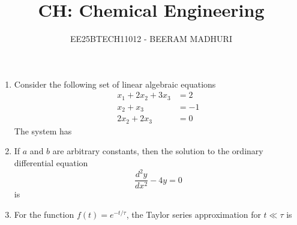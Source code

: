 \documentclass[journal,12pt,onecolumn]{IEEEtran}
\theoremstyle{remark}
\begin{document}
\title{CH: Chemical Engineering}
\author{EE25BTECH11012 - BEERAM MADHURI}
\maketitle
\renewcommand{\thefigure}{\theenumi}
\renewcommand{\thetable}{\theenumi}

\begin{enumerate}

\item Consider the following set of linear algebraic equations
\begin{align*}x_1 + 2x_2 + 3x_3 &= 2 \\x_2 + x_3 &= -1 \\2x_2 + 2x_3 &= 0\end{align*}
The system has
\hfill{}
\begin{enumerate}
\end{enumerate}

\item If $a$ and $b$ are arbitrary constants, then the solution to the ordinary differential equation
\[\frac{d^2 y}{dx^2} - 4y = 0\]
is
\hfill{}
\begin{enumerate}
\end{enumerate}

\item For the function $f(t) = e^{-t/\tau}$,
the Taylor series approximation for $t \ll \tau$ is
\hfill{}
\begin{enumerate}
\end{enumerate}


\end{enumerate}
\end{document}
